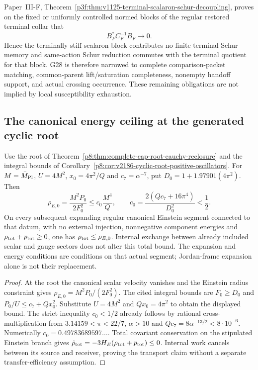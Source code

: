 \documentclass[12pt,a4paper]{article}
\begin{document}
\begin{corollary}
\label{p8:cor:v2115-g28-scalaron-schur-closed}
Paper~III-F, Theorem~\ref{p3f:thm:v1125-terminal-scalaron-schur-decoupling},
proves on the fixed or uniformly controlled normed blocks of the regular
restored terminal collar that
\[
 B_F^*C_F^{-1}B_F\to0.
\]
Hence the terminally stiff scalaron block contributes no finite terminal Schur
memory and same-action Schur reduction commutes with the terminal quotient for
that block.  G28 is therefore narrowed to complete comparison-packet
matching, common-parent lift/saturation completeness, nonempty handoff support,
and actual crossing occurrence.  These remaining obligations are not implied
by local susceptibility exhaustion.
\end{corollary}



\subsection{The canonical energy ceiling at the generated cyclic root}
\label{p8:sec:v215-actual-root-energy}
\begin{corollary}
\label{p8:cor:v215-actual-root-energy}
Use the root of Theorem~\ref{p8:thm:complete-cap-root-cauchy-reclosure}
and the integral bounds of
Corollary~\ref{p8:cor:v2186-cyclic-root-positive-oscillators}.
For $M=\bar M_{\rm Pl}$, $U=4M^2$, $x_0=4\pi^2/Q$ and
$c_7=\alpha^{-7}$, put $D_0=1+1.97901(4\pi^2)$. Then
\[
 \rho_{E,0}=\frac{M^2P_0}{2F_0^2}
 \le c_0\frac{M^4}{Q},\qquad
 c_0=\frac{2(Qc_7+16\pi^4)}{D_0^2}<\frac12.
\]
On every subsequent expanding regular canonical Einstein segment
connected to that datum, with no external injection, nonnegative
component energies and $\rho_{\rm tot}+p_{\rm tot}\ge0$, one has
$\rho_{\rm tot}\le\rho_{E,0}$. Internal exchange between already
included scalar and gauge sectors does not alter this total bound.
The expansion and energy conditions are conditions on that actual
segment; Jordan-frame expansion alone is not their replacement.
\end{corollary}
\begin{proof}
At the root the canonical scalar velocity vanishes and the Einstein
radius constraint gives $\rho_{E,0}=M^2P_0/(2F_0^2)$.
The cited integral bounds are $F_0\ge D_0$ and
$P_0/U\le c_7+Qx_0^2$. Substitute $U=4M^2$ and $Qx_0=4\pi^2$
to obtain the displayed bound. The strict inequality $c_0<1/2$
already follows by rational cross-multiplication from
$3.14159<\pi<22/7$, $\alpha>10$ and
$Qc_7=8\alpha^{-13/2}<8\cdot10^{-6}$.
Numerically $c_0=0.49783689597\ldots$.
Total covariant conservation on the stipulated Einstein branch gives
$\dot\rho_{\rm tot}=-3H_E(\rho_{\rm tot}+p_{\rm tot})\le0$.
Internal work cancels between its source and receiver, proving the
transport claim without a separate transfer-efficiency assumption.
\end{proof}
\end{document}
